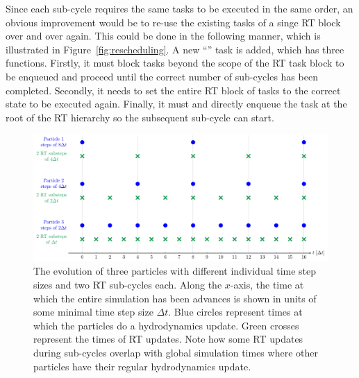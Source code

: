 Since each sub-cycle requires the same tasks to be executed in the same order, an obvious
improvement would be to re-use the existing tasks of a singe RT block over and over again. This
could be done in the following manner, which is illustrated in Figure~\ref{fig:rescheduling}. A new
``'' task is added, which has three functions. Firstly, it must block tasks
beyond the scope of the RT task block to be enqueued and proceed until the correct number of
sub-cycles has been completed. Secondly, it needs to set the entire RT block of tasks to the correct
state to be executed again. Finally, it must and directly enqueue the task at the root of the RT
hierarchy so the subsequent sub-cycle can start.



\begin{figure}
 \centering
 \includegraphics[width=\textwidth]{figures/RHD/two_rt_steps_per_hydro_step.pdf}%
 \caption{
The evolution of three particles with different individual time step sizes and two RT sub-cycles
each. Along the $x$-axis, the time at which the entire simulation has been advances is shown in
units of some minimal time step size $\Delta t$. Blue circles represent times at which the
particles do a hydrodynamics update. Green crosses represent the times of RT updates. Note how some
RT updates during sub-cycles overlap with global simulation times where other particles have their
regular hydrodynamics update.
 }
 \label{fig:two-subcycles-per-step}
\end{figure}




